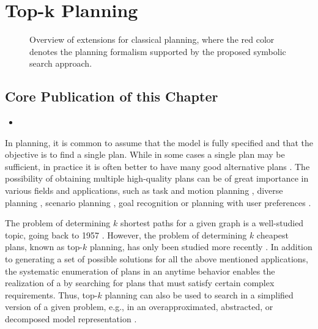 \chapter{Top-k Planning}\label{ch:topk}

\renewcommand{\kiviatTopk}{2}
\begin{figure}[t]
    \begin{center}
        
    \end{center}
    \caption[Overview of extension for classical planning (top-$k$).]{Overview of extensions for classical planning, where the red color denotes the planning formalism supported by the proposed symbolic search approach.}\label{fig:top_k:kiviat}
\end{figure}
\renewcommand{\kiviatTopk}{1}

\section*{Core Publication of this Chapter}
\renewcommand{\citebf}[1]{\textbf{#1}}
\begin{itemize}
    \item {}
\end{itemize}
\renewcommand{\citebf}[1]{#1}

In planning, it is common to assume that the model is fully specified and that the objective is to find a single plan.
While in some cases a single plan may be sufficient, in practice it is often better to have many good alternative plans \autocite{nguyen-et-al-aij2012}.
The possibility of obtaining multiple high-quality plans can be of great importance in various fields and applications, such as task and motion planning \autocite{lavalle-2006,ren-et-al-arxiv2021,lozano-et-al-iros2014}, diverse planning \autocite{katz-et-al-aaai2020}, scenario planning \autocite{sohrabi-et-al-aaai2018}, goal recognition \autocite{sohrabi-et-al-ijcai2016} or planning with user preferences \autocite{nguyen-et-al-aij2012,seimetz-et-al-ijcai2021}.

The problem of determining $k$ shortest paths for a given graph is a well-studied topic, going back to 1957 \autocite{bock-et-al-1957}.
However, the problem of determining $k$ cheapest plans, known as top-$k$ planning, has only been studied more recently \autocite{riabov-et-al-icaps2014wsspark}.
In addition to generating a set of possible solutions for all the above mentioned applications, the systematic enumeration of plans in an anytime behavior enables the realization of a  by searching for plans that must satisfy certain complex requirements.
Thus, top-$k$ planning can also be used to search in a simplified version of a given problem, e.g., in an overapproximated, abstracted, or decomposed model representation \autocite{hoeller-icaps2021}.

